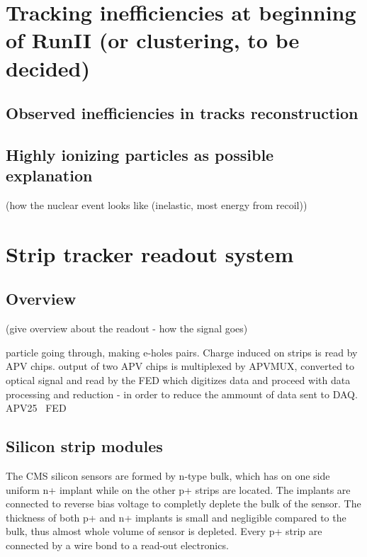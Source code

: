 
\section{Tracking inefficiencies at beginning of RunII (or clustering, to be decided)}

\subsection{Observed inefficiencies in tracks reconstruction}
\subsection{Highly ionizing particles as possible explanation}
        (how the nuclear event looks like (inelastic, most energy from recoil))


\section{Strip tracker readout system}

\subsection{Overview}
       (give overview about the readout - how the signal goes)

particle going through, making e-holes pairs. Charge induced on strips is read by APV chips. output of two APV chips is multiplexed by APVMUX, converted to optical signal and read by the FED which digitizes data  and proceed with data processing and reduction - in order to reduce the ammount of data sent to DAQ.
APV25~\cite{French:2001xb}
FED~\cite{Baird:2002wg}
\subsection{Silicon strip modules}

The CMS silicon sensors are formed by n-type bulk, which has on one side uniform n+ implant while on the other p+ strips are located. The implants are connected to reverse bias voltage to completly deplete the bulk of the sensor. The thickness of both p+ and n+ implants is small and negligible compared to the bulk, thus almost whole volume of sensor is depleted. Every p+ strip are connected by a wire bond to a read-out electronics.

